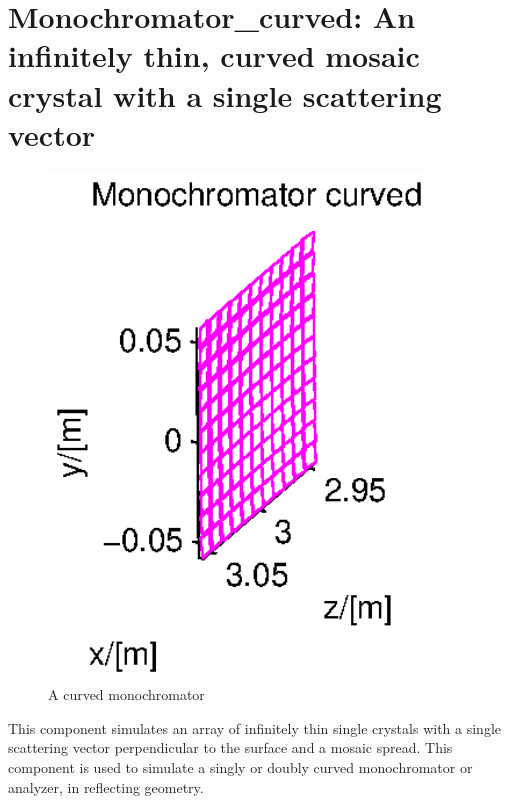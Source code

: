 
\section{Monochromator\_curved: An infinitely thin, curved mosaic crystal with
a single scattering vector}
\label{s:monochromator_curved}


\begin{figure}
  \begin{center}
    \includegraphics[width=0.9\textwidth]{figures/monochromator_curved.eps}
  \end{center}
\caption{A curved monochromator}
\label{f:monochromator_curved}
\end{figure}


This component simulates an array of infinitely thin single
crystals with a single scattering vector perpendicular to the
surface and a mosaic spread.
This component is used to simulate a singly or doubly
curved monochromator or analyzer, in reflecting geometry.

